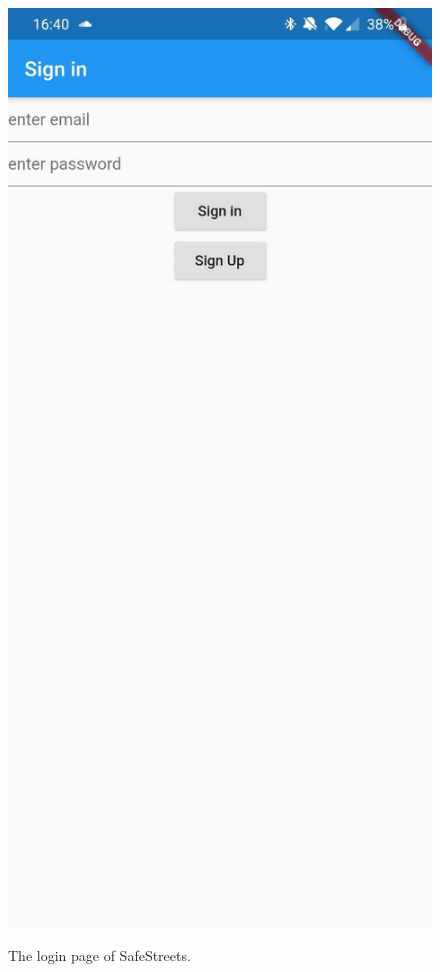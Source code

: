 \documentclass[../RASD.tex]{subfiles}
\begin{document}
    \begin{figure}[H]
        \centering
        \includegraphics[scale = 0.2]{assets/app_screenshots/login.jpg}\\[1.6 cm]
        \caption[\textit{Login} Screenshot]{The login page of SafeStreets.}
    \end{figure}
\end{document}
